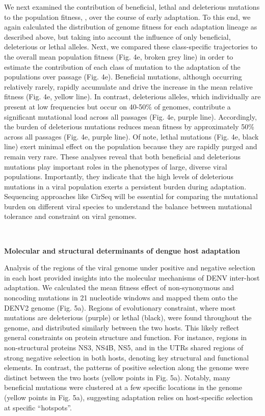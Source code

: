 \documentclass[
]{article}
\begin{document}
We next examined the contribution of beneficial, lethal and deleterious
mutations to the population fitness, \(\), over the course of early
adaptation. To this end, we again calculated the distribution of genome
fitness for each adaptation lineage as described above, but taking into
account the influence of only beneficial, deleterious or lethal alleles.
Next, we compared these class-specific trajectories to the overall mean
population fitness (Fig. 4e, broken grey line) in order to estimate the
contribution of each class of mutation to the adaptation of the
populations over passage (Fig. 4e). Beneficial mutations, although
occurring relatively rarely, rapidly accumulate and drive the increase
in the mean relative fitness (Fig. 4e, yellow line). In contrast,
deleterious alleles, which individually are present at low frequencies
but occur on 40-50\% of genomes, contribute a significant mutational
load across all passages (Fig. 4e, purple line). Accordingly, the burden
of deleterious mutations reduces mean fitness by approximately 50\%
across all passages (Fig. 4e, purple line). Of note, lethal mutations
(Fig. 4e, black line) exert minimal effect on the population because
they are rapidly purged and remain very rare. These analyses reveal that
both beneficial and deleterious mutations play important roles in the
phenotypes of large, diverse viral populations. Importantly, they
indicate that the high levels of deleterious mutations in a viral
population exerts a persistent burden during adaptation. Sequencing
approaches like CirSeq will be essential for comparing the mutational
burden on different viral species to understand the balance between
mutational tolerance and constraint on viral genomes.

\textbf{~}

\textbf{Molecular and structural determinants of dengue host adaptation}

Analysis of the regions of the viral genome under positive and negative
selection in each host provided insights into the molecular mechanisms
of DENV inter-host adaptation. We calculated the mean fitness effect of
non-synonymous and noncoding mutations in 21 nucleotide windows and
mapped them onto the DENV2 genome (Fig. 5a). Regions of evolutionary
constraint, where most mutations are deleterious (purple) or lethal
(black), were found throughout the genome, and distributed similarly
between the two hosts. This likely reflect general constraints on
protein structure and function. For instance, regions in non-structural
proteins NS3, NS4B, NS5, and in the UTRs shared regions of strong
negative selection in both hosts, denoting key structural and functional
elements. In contrast, the patterns of positive selection along the
genome were distinct between the two hosts (yellow points in Fig. 5a).
Notably, many beneficial mutations were clustered at a few specific
locations in the genome (yellow points in Fig. 5a), suggesting
adaptation relies on host-specific selection at specific ``hotspots''.
\end{document}
